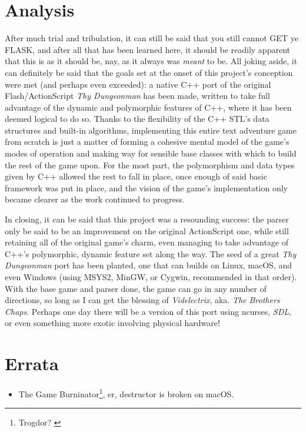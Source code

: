 \documentclass[man,12pt]{apa6}
\begin{document}
\section{Analysis}
After much trial and tribulation, it can still be said that you still cannot
\textsf{GET ye FLASK}, and after all that has been learned here, it should be
readily apparent that this is as it should be, nay, as it always was
\emph{meant} to be.  All joking aside, it can definitely be said that the
goals set at the onset of this project's conception were met (and perhaps even
exceeded): a native C++ port of the original Flash/ActionScript \emph{Thy
Dungeonman} has been made, written to take full advantage of the dynamic and
polymorphic features of C++, where it has been deemed logical to do so.
Thanks to the flexibility of the C++ STL's data structures and
built-in algorithms, implementing this entire text adventure game from scratch
is just a matter of forming a cohesive mental model of the game's modes of
operation and making way for sensible base classes with which to
build the rest of the game upon.  For the most part, the polymorphism and data
types given by C++ allowed the rest to fall in place, once enough of
said basic framework was put in place, and the vision of the game's
implementation only became clearer as the work continued to progress.

In closing, it can be said that this project was a resounding success: the
parser only be said to be an improvement on the original ActionScript one,
while still retaining all of the original game's charm, even managing to take
advantage of C++'s polymorphic, dynamic feature set along the way.  The seed of
a great \emph{Thy Dungeonman} port has been planted, one that can builds on
Linux, macOS, and even Windows (using MSYS2, MinGW, or Cygwin, recommended in
that order).  With the base game and parser done, the game
can go in any number of directions, so long as I can get the blessing of
\emph{Videlectrix}, aka. \emph{The Brothers Chaps}.  Perhaps one day there will
be a version of this port using \textsf{ncurses}, \emph{SDL}, or even something
more exotic involving physical hardware!

\section{Errata}
\begin{itemize}
  \item The \textsf{Game} Burninator\footnote{Trogdor? \parencite{hrw-trog}}, er, destructor is
        broken on macOS.
\end{itemize}

\printbibliography
\end{document}
